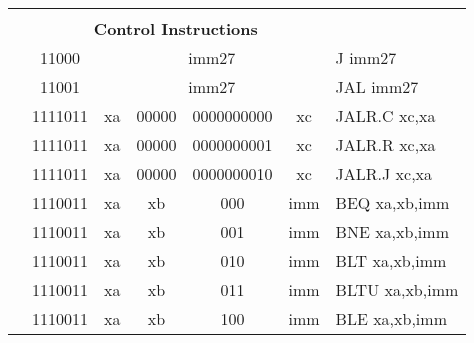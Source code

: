 \begin{table}[p]
\begin{small}
\begin{center}
\begin{tabular}{rcccccccccl}
&
\multicolumn{9}{c}{} & \\
&
\multicolumn{9}{c}{\bf Control Instructions} & \\
\cline{2-10}
  

&
\multicolumn{1}{|c|}{11000} &
\multicolumn{8}{c|}{imm27} & J imm27 \\
\cline{2-10}
  

&
\multicolumn{1}{|c|}{11001} &
\multicolumn{8}{c|}{imm27} & JAL imm27 \\
\cline{2-10}
  

&
\multicolumn{2}{|c|}{1111011} &
\multicolumn{1}{c|}{xa} &
\multicolumn{1}{c|}{00000} &
\multicolumn{4}{c|}{0000000000} &
\multicolumn{1}{c|}{xc} & JALR.C xc,xa \\
\cline{2-10}
  

&
\multicolumn{2}{|c|}{1111011} &
\multicolumn{1}{c|}{xa} &
\multicolumn{1}{c|}{00000} &
\multicolumn{4}{c|}{0000000001} &
\multicolumn{1}{c|}{xc} & JALR.R xc,xa \\
\cline{2-10}
  

&
\multicolumn{2}{|c|}{1111011} &
\multicolumn{1}{c|}{xa} &
\multicolumn{1}{c|}{00000} &
\multicolumn{4}{c|}{0000000010} &
\multicolumn{1}{c|}{xc} & JALR.J xc,xa \\
\cline{2-10}
  

&
\multicolumn{2}{|c|}{1110011} &
\multicolumn{1}{c|}{xa} &
\multicolumn{1}{c|}{xb} &
\multicolumn{1}{c|}{000} &
\multicolumn{4}{c|}{imm} & BEQ xa,xb,imm \\
\cline{2-10}
  

&
\multicolumn{2}{|c|}{1110011} &
\multicolumn{1}{c|}{xa} &
\multicolumn{1}{c|}{xb} &
\multicolumn{1}{c|}{001} &
\multicolumn{4}{c|}{imm} & BNE xa,xb,imm \\
\cline{2-10}
  

&
\multicolumn{2}{|c|}{1110011} &
\multicolumn{1}{c|}{xa} &
\multicolumn{1}{c|}{xb} &
\multicolumn{1}{c|}{010} &
\multicolumn{4}{c|}{imm} & BLT xa,xb,imm \\
\cline{2-10}
  

&
\multicolumn{2}{|c|}{1110011} &
\multicolumn{1}{c|}{xa} &
\multicolumn{1}{c|}{xb} &
\multicolumn{1}{c|}{011} &
\multicolumn{4}{c|}{imm} & BLTU xa,xb,imm \\
\cline{2-10}
  

&
\multicolumn{2}{|c|}{1110011} &
\multicolumn{1}{c|}{xa} &
\multicolumn{1}{c|}{xb} &
\multicolumn{1}{c|}{100} &
\multicolumn{4}{c|}{imm} & BLE xa,xb,imm \\
\cline{2-10}
  


\end{tabular}
\end{center}
\end{small}
\end{table}
